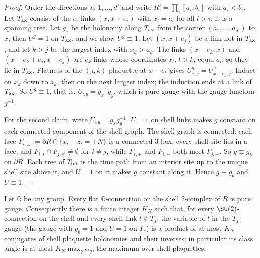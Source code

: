 \begin{proof}
Order the directions as $1,\dots,d'$ and write $R'=\prod_i[a_i,b_i]$ with $a_i<b_i$. Let $T_{\rm ax}$ consist of the $e_i$-links $(x,x+e_i)$ with $x_l=a_l$ for all $l>i$; it is a spanning tree. Let $g_x$ be the holonomy along $T_{\rm ax}$ from the corner $(a_1,\dots,a_{d'})$ to $x$; then $U^g=1$ on $T_{\rm ax}$, and we show $U^g\equiv1$. Let $(x,x+e_j)$ be a link not in $T_{\rm ax}$, and let $k>j$ be the largest index with $x_k>a_k$. The links $(x-e_k,x)$ and $(x-e_k+e_j,x+e_j)$ are $e_k$-links whose coordinates $x_l$, $l>k$, equal $a_l$, so they lie in $T_{\rm ax}$. Flatness of the $(j,k)$ plaquette at $x-e_k$ gives $U^g_{x,j}=U^g_{x-e_k,j}$. Induct on $x_k$ down to $a_k$, then on the next largest index; the induction ends at a link of $T_{\rm ax}$. So $U^g\equiv1$, that is, $U_{xy}=g_x^{-1}g_y$, which is pure gauge with the gauge function $g^{-1}$.

For the second claim, write $U_{xy}=g_xg_y^{-1}$. $U=1$ on shell links makes $g$ constant on each connected component of the shell graph. The shell graph is connected: each face $F_{i,\pm}:=\partial R\cap\{x_i-z_i=\pm N\}$ is a connected $3$-box, every shell site lies in a face, and $F_{i,s}\cap F_{j,s'}\ne\emptyset$ for $i\ne j$, while $F_{i,+}$ and $F_{i,-}$ both meet $F_{j,+}$. So $g\equiv g_b$ on $\partial R$. Each tree of $T_{\rm int}$ is the time path from an interior site up to the unique shell site above it, and $U=1$ on it makes $g$ constant along it. Hence $g\equiv g_b$ and $U\equiv1$.
\end{proof}

\begin{lemma}\label{pf:lem-shell}
Let $\mathbb G$ be any group. Every flat $\mathbb G$-connection on the shell $2$-complex of $R$ is pure gauge. Consequently there is a finite integer $K_N$ such that, for every $\SU(2)$-connection on the shell and every shell link $l\notin T_s$, the variable of $l$ in the $T_s$-gauge (the gauge with $g_b=1$ and $U=1$ on $T_s$) is a product of at most $K_N$ conjugates of shell plaquette holonomies and their inverses; in particular its class angle is at most $K_N\max_q\alpha_q$, the maximum over shell plaquettes.
\end{lemma}

